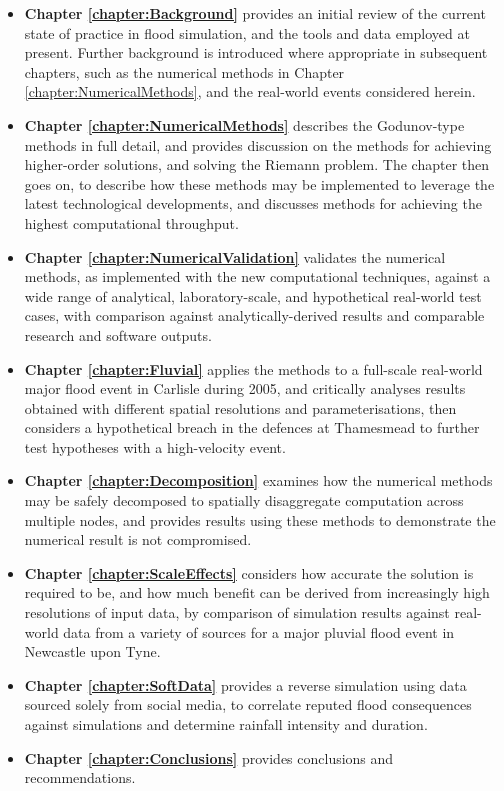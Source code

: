 \begin{itemize}
	\item \textbf{Chapter \ref{chapter:Background}} provides an initial review of the current state of practice in flood simulation, and the tools and data employed at present. Further background is introduced where appropriate in subsequent chapters, such as the numerical methods in Chapter \ref{chapter:NumericalMethods}, and the real-world events considered herein.
	\item \textbf{Chapter \ref{chapter:NumericalMethods}} describes the Godunov-type methods in full detail, and provides discussion on the methods for achieving higher-order solutions, and solving the Riemann problem. The chapter then goes on, to describe how these methods may be implemented to leverage the latest technological developments, and discusses methods for achieving the highest computational throughput.
	\item \textbf{Chapter \ref{chapter:NumericalValidation}} validates the numerical methods, as implemented with the new computational techniques, against a wide range of analytical, laboratory-scale, and hypothetical real-world test cases, with comparison against analytically-derived results and comparable research and software outputs.
	\item \textbf{Chapter \ref{chapter:Fluvial}} applies the methods to a full-scale real-world major flood event in Carlisle during 2005, and critically analyses results obtained with different spatial resolutions and parameterisations, then considers a hypothetical breach in the defences at Thamesmead to further test hypotheses with a high-velocity event.
	\item \textbf{Chapter \ref{chapter:Decomposition}} examines how the numerical methods may be safely decomposed to spatially disaggregate computation across multiple nodes, and provides results using these methods to demonstrate the numerical result is not compromised.
	\item \textbf{Chapter \ref{chapter:ScaleEffects}} considers how accurate the solution is required to be, and how much benefit can be derived from increasingly high resolutions of input data, by comparison of simulation results against real-world data from a variety of sources for a major pluvial flood event in Newcastle upon Tyne.
	\item \textbf{Chapter \ref{chapter:SoftData}} provides a reverse simulation using data sourced solely from social media, to correlate reputed flood consequences against simulations and determine rainfall intensity and duration.
	\item \textbf{Chapter \ref{chapter:Conclusions}} provides conclusions and recommendations.
\end{itemize}
